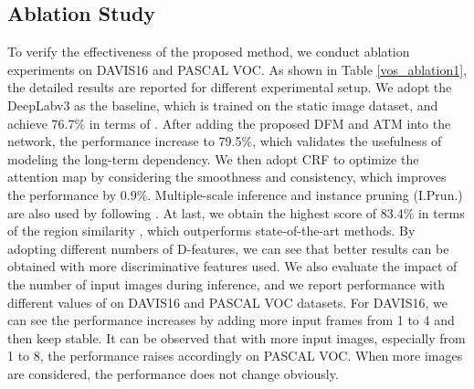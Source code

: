 \documentclass[runningheads]{llncs}
\begin{document}
\begin{table*}[t!]
	\caption{Ablation study  on  DAVIS16 with different components used and  different numbers of D-features adopted. We also compare the performance  for different numbers of input images  on DAVIS16 and PASCAL VOC. }
\centering
	\label{vos_ablation1}
\end{table*}
\subsection{Ablation Study}\label{exp_ablation}
To verify the effectiveness of the proposed method, we conduct ablation experiments on DAVIS16 and PASCAL VOC. As shown in Table \ref{vos_ablation1}, the detailed results are reported for different experimental setup. We adopt the DeepLabv3 as the baseline, which is trained on the static image dataset, and achieve 76.7\% in terms of . After adding the proposed DFM and ATM into the network, the performance increase to 79.5\%, which validates the usefulness of modeling the long-term dependency. We then adopt  CRF to optimize the attention map by considering the smoothness and consistency, which improves the performance by 0.9\%. Multiple-scale inference and instance pruning (I.Prun.) are also used by following \cite{vos_andiff}. At last, we obtain the highest score of 83.4\% in terms of the region similarity , which outperforms state-of-the-art methods. By adopting different numbers of D-features, we can see that better results can be obtained with more discriminative features used. We also evaluate the impact of the number of input images during inference, and we report performance with different values of  on  DAVIS16 and PASCAL VOC datasets. For DAVIS16, we can see the performance increases by adding more input frames from 1 to 4 and then keep stable. It can be observed that with more input images, especially from 1  to 8, the performance raises accordingly on PASCAL VOC. When more images are considered, the performance does not change obviously. 
\end{document}
